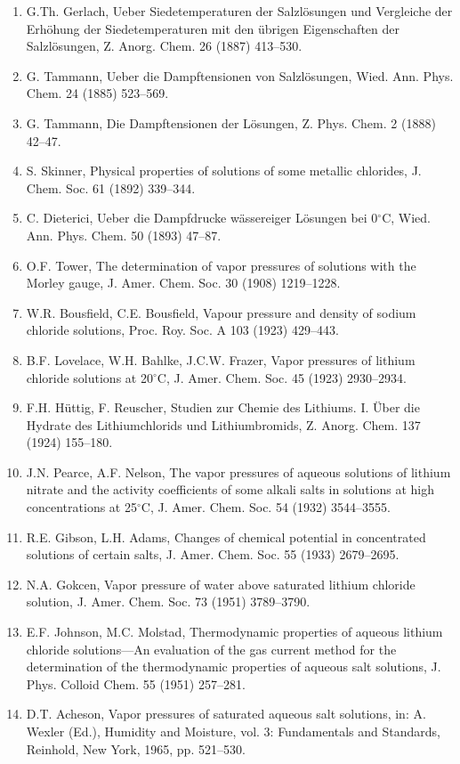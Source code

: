\documentclass[11pt]{article}
\begin{document}
\begin{enumerate}
\item G.Th. Gerlach, Ueber Siedetemperaturen der Salzl\"osungen und Vergleiche der Erh\"ohung der Siedetemperaturen mit den \"ubrigen Eigenschaften der Salzl\"osungen, Z. Anorg. Chem. 26 (1887) 413--530.
\item G. Tammann, Ueber die Dampftensionen von Salzl\"osungen, Wied. Ann. Phys. Chem. 24 (1885) 523--569.
\item G. Tammann, Die Dampftensionen der L\"osungen, Z. Phys. Chem. 2 (1888) 42--47.
\item S. Skinner, Physical properties of solutions of some metallic chlorides, J. Chem. Soc. 61 (1892) 339--344.
\item C. Dieterici, Ueber die Dampfdrucke w\"assereiger L\"osungen bei 0$^\circ$C, Wied. Ann. Phys. Chem. 50 (1893) 47--87.
\item O.F. Tower, The determination of vapor pressures of solutions with the Morley gauge, J. Amer. Chem. Soc. 30 (1908) 1219--1228.
\item W.R. Bousfield, C.E. Bousfield, Vapour pressure and density of sodium chloride solutions, Proc. Roy. Soc. A 103 (1923) 429--443.
\item B.F. Lovelace, W.H. Bahlke, J.C.W. Frazer, Vapor pressures of lithium chloride solutions at 20$^\circ$C, J. Amer. Chem. Soc. 45 (1923) 2930--2934.
\item F.H. H\"uttig, F. Reuscher, Studien zur Chemie des Lithiums. I. \"Uber die Hydrate des Lithiumchlorids und Lithiumbromids, Z. Anorg. Chem. 137 (1924) 155--180.
\item J.N. Pearce, A.F. Nelson, The vapor pressures of aqueous solutions of lithium nitrate and the activity coefficients of some alkali salts in solutions at high concentrations at 25$^\circ$C, J. Amer. Chem. Soc. 54 (1932) 3544--3555.
\item R.E. Gibson, L.H. Adams, Changes of chemical potential in concentrated solutions of certain salts, J. Amer. Chem. Soc. 55 (1933) 2679--2695.
\item N.A. Gokcen, Vapor pressure of water above saturated lithium chloride solution, J. Amer. Chem. Soc. 73 (1951) 3789--3790.
\item E.F. Johnson, M.C. Molstad, Thermodynamic properties of aqueous lithium chloride solutions---An evaluation of the gas current method for the determination of the thermodynamic properties of aqueous salt solutions, J. Phys. Colloid Chem. 55 (1951) 257--281.
\item D.T. Acheson, Vapor pressures of saturated aqueous salt solutions, in: A. Wexler (Ed.), Humidity and Moisture, vol. 3: Fundamentals and Standards, Reinhold, New York, 1965, pp. 521--530.

\end{enumerate}
\end{document}
